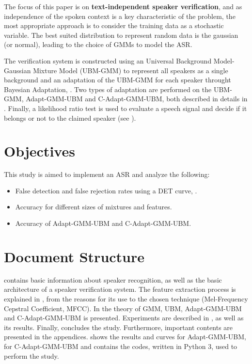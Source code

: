 The focus of this paper is on \textbf{text-independent speaker verification}, and as independence of the spoken context is a key characteristic of the problem, the most appropriate approach is to consider the training data as a stochastic variable. The best suited distribution to represent random data is the gaussian (or normal), leading to the choice of GMMs to model the ASR.

The verification system is constructed using an Universal Background Model-Gaussian Mixture Model (UBM-GMM) to represent all speakers as a single background and an adaptation of the UBM-GMM for each speaker throught Bayesian Adaptation, . Two types of adaptation are performed on the UBM-GMM, Adapt-GMM-UBM and C-Adapt-GMM-UBM, both described in details in . Finally, a likelihood ratio test is used to evaluate a speech signal and decide if it belongs or not to the claimed speaker (see ).

\section{Objectives}

This study is aimed to implement an ASR and analyze the following:

\begin{itemize}\itemsep0pt
    \item False detection and false rejection rates using a DET curve, .
    \item Accuracy for different sizes of mixtures and features.
    \item Accuracy of Adapt-GMM-UBM and C-Adapt-GMM-UBM.
\end{itemize}

\section{Document Structure}

 contains basic information about speaker recognition, as well as the basic architecture of a speaker verification system. The feature extraction process is explained in , from the reasons for its use to the chosen technique (Mel-Frequency Cepstral Coefficient, MFCC). In  the theory of GMM, UBM, Adapt-GMM-UBM and C-Adapt-GMM-UBM is presented. Experiments are described in , as well as its results. Finally,  concludes the study. Furthermore, important contents are presented in the appendices.  shows the results and curves for Adapt-GMM-UBM,  for C-Adapt-GMM-UBM and  contains the codes, written in Python 3, used to perform the study.